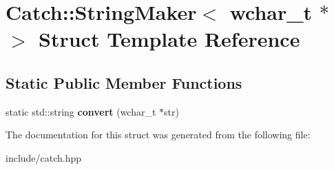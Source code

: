 \hypertarget{structCatch_1_1StringMaker_3_01wchar__t_01_5_01_4}{}\section{Catch\+:\+:String\+Maker$<$ wchar\+\_\+t $\ast$ $>$ Struct Template Reference}
\label{structCatch_1_1StringMaker_3_01wchar__t_01_5_01_4}
\subsection*{Static Public Member Functions}
\begin{DoxyCompactItemize}
\item 
static std\+::string {\bfseries convert} (wchar\+\_\+t $\ast$str)\hypertarget{structCatch_1_1StringMaker_3_01wchar__t_01_5_01_4_a6112fe324da2a0b3a690071a228ecd71}{}\label{structCatch_1_1StringMaker_3_01wchar__t_01_5_01_4_a6112fe324da2a0b3a690071a228ecd71}

\end{DoxyCompactItemize}


The documentation for this struct was generated from the following file\+:\begin{DoxyCompactItemize}
\item 
include/catch.\+hpp\end{DoxyCompactItemize}
